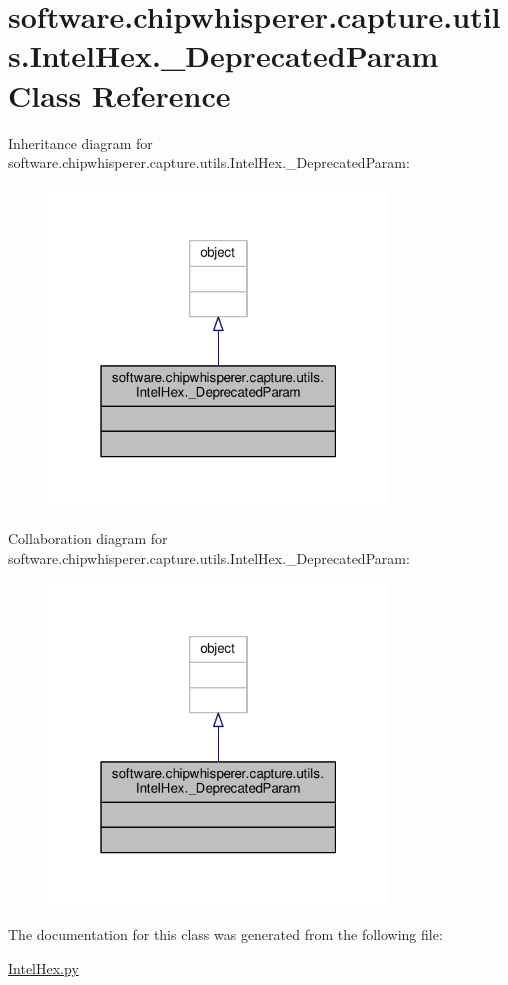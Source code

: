 \hypertarget{classsoftware_1_1chipwhisperer_1_1capture_1_1utils_1_1IntelHex_1_1__DeprecatedParam}{}\section{software.\+chipwhisperer.\+capture.\+utils.\+Intel\+Hex.\+\_\+\+Deprecated\+Param Class Reference}
\label{classsoftware_1_1chipwhisperer_1_1capture_1_1utils_1_1IntelHex_1_1__DeprecatedParam}


Inheritance diagram for software.\+chipwhisperer.\+capture.\+utils.\+Intel\+Hex.\+\_\+\+Deprecated\+Param\+:\nopagebreak
\begin{figure}[H]
\begin{center}
\leavevmode
\includegraphics[width=256pt]{d6/d14/classsoftware_1_1chipwhisperer_1_1capture_1_1utils_1_1IntelHex_1_1__DeprecatedParam__inherit__graph}
\end{center}
\end{figure}


Collaboration diagram for software.\+chipwhisperer.\+capture.\+utils.\+Intel\+Hex.\+\_\+\+Deprecated\+Param\+:\nopagebreak
\begin{figure}[H]
\begin{center}
\leavevmode
\includegraphics[width=256pt]{dd/d6e/classsoftware_1_1chipwhisperer_1_1capture_1_1utils_1_1IntelHex_1_1__DeprecatedParam__coll__graph}
\end{center}
\end{figure}


The documentation for this class was generated from the following file\+:\begin{DoxyCompactItemize}
\item 
\hyperlink{IntelHex_8py}{Intel\+Hex.\+py}\end{DoxyCompactItemize}
